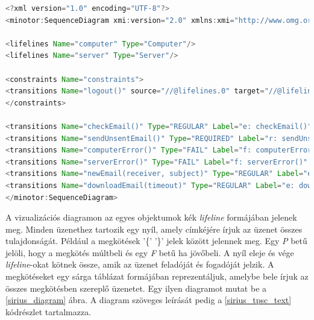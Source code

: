 \begin{lstlisting}[language=java, frame=single, float=ht!, caption={Szcenárió diagram xml leírása.},captionpos=b, label=sirius_xml]
<?xml version="1.0" encoding="UTF-8"?>
<minotor:SequenceDiagram xmi:version="2.0" xmlns:xmi="http://www.omg.org/XMI" xmlns:minotor="hu.bme.mit.mdsd.xboyz.erdiagram" Name="Email">

<lifelines Name="computer" Type="Computer"/>
<lifelines Name="server" Type="Server"/>

<constraints Name="constraints">
<transitions Name="logout()" source="//@lifelines.0" target="//@lifelines.1"/>
</constraints>

<transitions Name="checkEmail()" Type="REGULAR" Label="e: checkEmail()" source="//@lifelines.0" target="//@lifelines.0"  after="//@transitions.1" reset="x"/>
<transitions Name="sendUnsentEmail()" Type="REQUIRED" Label="r: sendUnsentEmail()" source="//@lifelines.0" target="//@lifelines.1" before="//@transitions.0" after="//@transitions.2"/>
<transitions Name="computerError()" Type="FAIL" Label="f: computerError()" source="//@lifelines.1" target="//@lifelines.0" before="//@transitions.1" after="//@transitions.3"/>
<transitions Name="serverError()" Type="FAIL" Label="f: serverError()" source="//@lifelines.0" target="//@lifelines.1" before="//@transitions.2" after="//@transitions.4"/>
<transitions Name="newEmail(receiver, subject)" Type="REGULAR" Label="e: newEmail(receiver, subject)" source="//@lifelines.0" target="//@lifelines.1" before="//@transitions.3" after="//@transitions.5" constraint="//@constraints.0" constraintType="PAST"/>
<transitions Name="downloadEmail(timeout)" Type="REGULAR" Label="e: downloadEmail(timeout)" source="//@lifelines.0" target="//@lifelines.1" before="//@transitions.4"   clockConstraint="x &gt; 10"/>
</minotor:SequenceDiagram>
\end{lstlisting}

A vizualizációs diagramon az egyes objektumok kék \textit{lifeline} formájában jelenek meg.
Minden üzenethez tartozik egy nyíl, amely címkéjére írjuk az üzenet összes tulajdonságát.
Például a megkötések '\{' '\}' jelek között jelennek meg.
Egy \textit{P} betű jelöli, hogy a megkötés múltbeli és egy \textit{F} betű ha jövőbeli.
A nyíl eleje és vége \textit{lifeline}-okat kötnek össze, amik az üzenet feladóját és fogadóját jelzik.
A megkötéseket egy sárga táblázat formájában reprezentáljuk, amelybe bele írjuk az összes megkötésben szereplő üzenetet.
Egy ilyen diagramot mutat be a \ref{sirius_diagram} ábra.
A diagram szöveges leírását pedig a \ref{sirius_tpsc_text} kódrészlet tartalmazza.

